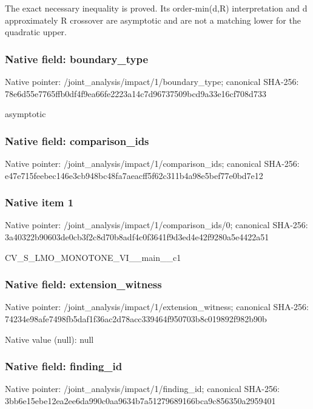 \documentclass[10pt,a4paper]{article}
\begin{document}
\begingroup\raggedright\sloppy The exact necessary inequality is proved. Its order-min(d,\allowbreak{}R) interpretation and d approximately R crossover are asymptotic and are not a matching lower for the quadratic upper.\par\endgroup

\subsubsection{Native field: boundary\_\allowbreak{}type}
Native pointer: /joint\_\allowbreak{}analysis/impact/1/boundary\_\allowbreak{}type; canonical SHA-256: 78e6d55e7765ffb0df4f9ea66fe2223a14c7d96737509bcd9a33e16cf708d733

\begingroup\raggedright\sloppy asymptotic\par\endgroup

\subsubsection{Native field: comparison\_\allowbreak{}ids}
Native pointer: /joint\_\allowbreak{}analysis/impact/1/comparison\_\allowbreak{}ids; canonical SHA-256: e47e715feebec146e3cb948bc48fa7aeacff5f62c311b4a98e5bef77e0bd7e12

\subsubsection{Native item 1}
Native pointer: /joint\_\allowbreak{}analysis/impact/1/comparison\_\allowbreak{}ids/0; canonical SHA-256: 3a40322b90603de0cb3f2c8d70b8adf4c0f3641f9d3ed4e42f9280a5e4422a51

\begingroup\raggedright\sloppy CV\_\allowbreak{}S\_\allowbreak{}LMO\_\allowbreak{}MONOTONE\_\allowbreak{}VI\_\allowbreak{}\_\allowbreak{}main\_\allowbreak{}\_\allowbreak{}c1\par\endgroup

\subsubsection{Native field: extension\_\allowbreak{}witness}
Native pointer: /joint\_\allowbreak{}analysis/impact/1/extension\_\allowbreak{}witness; canonical SHA-256: 74234e98afe7498fb5daf1f36ac2d78acc339464f950703b8c019892f982b90b

Native value (null): null

\subsubsection{Native field: finding\_\allowbreak{}id}
Native pointer: /joint\_\allowbreak{}analysis/impact/1/finding\_\allowbreak{}id; canonical SHA-256: 3bb6e15ebe12ea2ee6da990c0aa9634b7a51279689166bca9c856350a2959401
\end{document}
